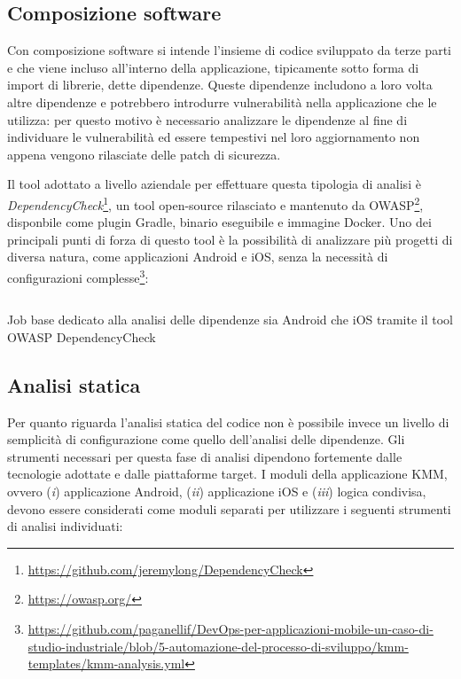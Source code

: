 \subsection{Composizione software}
Con composizione software si intende l'insieme di codice sviluppato da terze parti e che viene incluso all'interno della applicazione, tipicamente sotto forma di import di librerie, dette dipendenze. Queste dipendenze includono a loro volta altre dipendenze e potrebbero introdurre vulnerabilità nella applicazione che le utilizza: per questo motivo è necessario analizzare le dipendenze al fine di individuare le vulnerabilità ed essere tempestivi nel loro aggiornamento non appena vengono rilasciate delle patch di sicurezza. 

Il tool adottato a livello aziendale per effettuare questa tipologia di analisi è \textit{DependencyCheck}\footnote{\href{https://github.com/jeremylong/DependencyCheck}{https://github.com/jeremylong/DependencyCheck}}, un tool open-source rilasciato e mantenuto da OWASP\footnote{\href{https://owasp.org/}{https://owasp.org/}}, disponbile come plugin Gradle, binario eseguibile e immagine Docker. Uno dei principali punti di forza di questo tool è la possibilità di analizzare più progetti di diversa natura, come applicazioni Android e iOS, senza la necessità di configurazioni complesse\footnote{\href{https://github.com/paganellif/DevOps-per-applicazioni-mobile-un-caso-di-studio-industriale/blob/5-automazione-del-processo-di-sviluppo/kmm-templates/kmm-analysis.yml}{https://github.com/paganellif/DevOps-per-applicazioni-mobile-un-caso-di-studio-industriale/blob/5-automazione-del-processo-di-sviluppo/kmm-templates/kmm-analysis.yml}}:

\begin{listing}[H]
    \inputminted{yaml}{code/depcheck-job.yaml}
    \caption{Job base dedicato alla analisi delle dipendenze sia Android che iOS tramite il tool OWASP DependencyCheck}
\end{listing}

\subsection{Analisi statica}
Per quanto riguarda l'analisi statica del codice non è possibile invece un livello di semplicità di configurazione come quello dell'analisi delle dipendenze. Gli strumenti necessari per questa fase di analisi dipendono fortemente dalle tecnologie adottate e dalle piattaforme target. I moduli della applicazione KMM, ovvero (\textit{i}) applicazione Android, (\textit{ii}) applicazione iOS e (\textit{iii}) logica condivisa, devono essere considerati come moduli separati per utilizzare i seguenti strumenti di analisi individuati:

